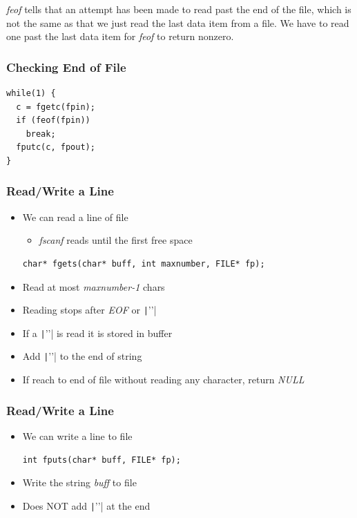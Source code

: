 \documentclass{../c-lecture}
\begin{document}
\begin{frame}
  \begin{block}{}
    \textit{\color{YellowOrange} feof} tells that an attempt has been made to read past the end of the file,
    which is not the same as that we just read the last data item from a file.
    We have to read one past the last data item for \textit{\color{YellowOrange} feof} to return nonzero.
  \end{block}
\end{frame}

\begin{frame}[fragile]
  \frametitle{Checking End of File}
  \begin{verbatim}
while(1) {
  c = fgetc(fpin);
  if (feof(fpin))
    break;
  fputc(c, fpout);
}
  \end{verbatim}
\end{frame}

\begin{frame}[fragile]
  \frametitle{Read/Write a Line}
  \begin{itemize}
    \item We can read a line of file
    \begin{itemize}
      \item
        \textit{\color{LimeGreen} fscanf} reads until the first free space
    \end{itemize}
    \begin{verbatim}
char* fgets(char* buff, int maxnumber, FILE* fp);
    \end{verbatim}
    \item Read at most \textit{\color{YellowOrange} maxnumber-1} chars
    \item
      Reading stops after \textit{\color{Cyan} EOF} or
      \texttt|'\n'|
    \item If a \texttt|'\n'| is read it is stored in buffer
    \item Add \texttt|'\0'| to the end of string
    \item
      If reach to end of file without reading any character, return
      \textit{\color{Cyan} NULL}
  \end{itemize}
\end{frame}

\begin{frame}[fragile]
  \frametitle{Read/Write a Line}
  \begin{itemize}
    \item We can write a line to file
    \begin{verbatim}
int fputs(char* buff, FILE* fp);
    \end{verbatim}
    \item Write the string \textit{\color{YellowOrange} buff} to file
    \item Does \textsc{\color{RubineRed} NOT} add \texttt|'\n'| at the end
  \end{itemize}
\end{frame}
\end{document}
